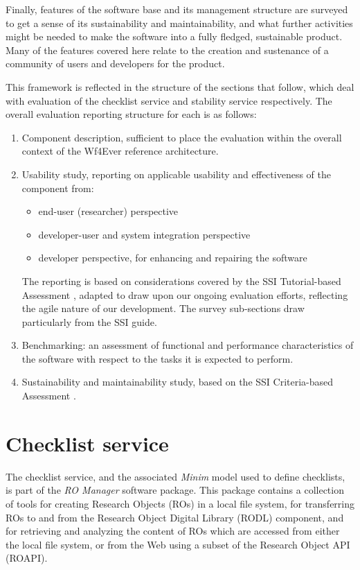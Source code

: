 Finally, features of the software base and its management structure are
surveyed to get a sense of its sustainability and maintainability, and
what further activities might be needed to make the software into a
fully fledged, sustainable product. Many of the features covered here
relate to the creation and sustenance of a community of users and
developers for the product.

This framework is reflected in the structure of the sections that
follow, which deal with evaluation of the checklist service and
stability service respectively. The overall evaluation reporting
structure for each is as follows:

\begin{enumerate}
\def\labelenumi{\arabic{enumi}.}
\item
  Component description, sufficient to place the evaluation within the
  overall context of the Wf4Ever reference architecture.
\item
  Usability study, reporting on applicable usability and effectiveness
  of the component from:

  \begin{itemize}
  \itemsep1pt\parskip0pt
  \item
    end-user (researcher) perspective
  \item
    developer-user and system integration perspective
  \item
    developer perspective, for enhancing and repairing the software
  \end{itemize}

  The reporting is based on considerations covered by the SSI
  Tutorial-based Assessment \cite{SSI-tutorial}, adapted to draw upon
  our ongoing evaluation efforts, reflecting the agile nature of our
  development. The survey sub-sections draw particularly from the SSI
  guide.
\item
  Benchmarking: an assessment of functional and performance
  characteristics of the software with respect to the tasks it is
  expected to perform.
\item
  Sustainability and maintainability study, based on the SSI
  Criteria-based Assessment \cite{SSI-criteria}.
\end{enumerate}

\section{Checklist service}

The checklist service, and the associated \emph{Minim} model used to
define checklists, is part of the \emph{RO Manager} software package.
This package contains a collection of tools for creating Research
Objects (ROs) in a local file system, for transferring ROs to and from
the Research Object Digital Library (RODL) component, and for retrieving
and analyzing the content of ROs which are accessed from either the
local file system, or from the Web using a subset of the Research Object
API (ROAPI).

